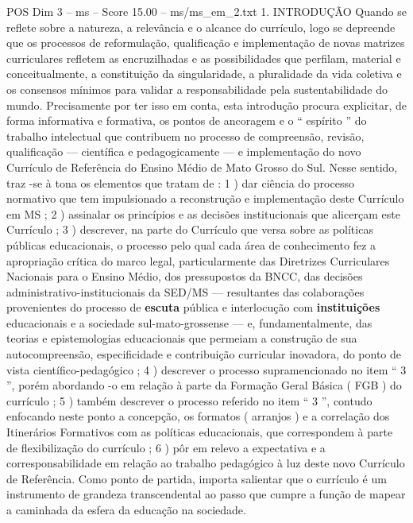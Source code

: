 \begin{textsample}{POS Dim 3 – ms – Score 15.00 – ms/ms\_em\_2.txt}  \label{ex:f3_pos_196}
1.
INTRODUÇÃO Quando se reflete sobre a natureza, a relevância e o alcance do currículo, logo se depreende que os processos de reformulação, qualificação e implementação de novas matrizes curriculares refletem as encruzilhadas e as possibilidades que perfilam, material e conceitualmente, a constituição da singularidade, a pluralidade da vida coletiva e os consensos mínimos para validar a responsabilidade pela sustentabilidade do mundo.
Precisamente por ter isso em conta, esta introdução procura explicitar, de forma informativa e formativa, os pontos de ancoragem e o “ espírito ” do trabalho intelectual que contribuem no processo de compreensão, revisão, qualificação — científica e pedagogicamente — e implementação do novo Currículo de Referência do Ensino Médio de Mato Grosso do Sul.
Nesse sentido, traz -se à tona os elementos que tratam de : 1 ) dar ciência do processo normativo que tem impulsionado a reconstrução e implementação deste Currículo em MS ; 2 ) assinalar os princípios e as decisões institucionais que alicerçam este Currículo ; 3 ) descrever, na parte do Currículo que versa sobre as políticas públicas educacionais, o processo pelo qual cada área de conhecimento fez a apropriação crítica do marco legal, particularmente das Diretrizes Curriculares Nacionais para o Ensino Médio, dos pressupostos da BNCC, das decisões administrativo-institucionais da SED/MS — resultantes das colaborações provenientes do processo de \textbf{escuta} pública e interlocução com \textbf{instituições} educacionais e a sociedade sul-mato-grossense — e, fundamentalmente, das teorias e epistemologias educacionais que permeiam a construção de sua autocompreensão, especificidade e contribuição curricular inovadora, do ponto de vista científico-pedagógico ; 4 ) descrever o processo supramencionado no item “ 3 ”, porém abordando -o em relação à parte da Formação Geral Básica ( FGB ) do currículo ; 5 ) também descrever o processo referido no item “ 3 ”, contudo enfocando neste ponto a concepção, os formatos ( arranjos ) e a correlação dos Itinerários Formativos com as políticas educacionais, que correspondem à parte de flexibilização do currículo ; 6 ) pôr em relevo a expectativa e a corresponsabilidade em relação ao trabalho pedagógico à luz deste novo Currículo de Referência.
Como ponto de partida, importa salientar que o currículo é um instrumento de grandeza transcendental ao passo que cumpre a função de mapear a caminhada da esfera da educação na sociedade.

\end{textsample}
